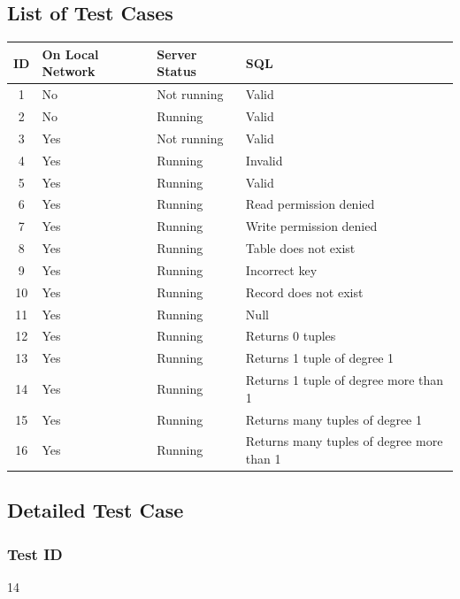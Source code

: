 \documentclass{article}
\begin{document}
\subsection{List of Test Cases}
\begin{center}
  \begin{tabular}{| c | l | l | l |}
    \hline
    ID & On Local Network & Server Status & SQL\\
    \hline
    1 & No & Not running & Valid\\
    2 & No & Running & Valid\\
	3 & Yes & Not running & Valid\\
    4 & Yes & Running & Invalid\\
    5 & Yes & Running & Valid\\
    6 & Yes & Running & Read permission denied\\
    7 & Yes & Running & Write permission denied\\
    8 & Yes & Running & Table does not exist\\
    9 & Yes & Running & Incorrect key\\
    10 & Yes & Running & Record does not exist\\
    11 & Yes & Running & Null\\
    12 & Yes & Running & Returns 0 tuples\\
    13 & Yes & Running & Returns 1 tuple of degree 1\\
    14 & Yes & Running & Returns 1 tuple of degree more than 1\\
    15 & Yes & Running & Returns many tuples of degree 1\\
    16 & Yes & Running & Returns many tuples of degree more than 1\\
    \hline
  \end{tabular}
\end{center}

\subsection{Detailed Test Case}
\subsubsection{Test ID}
14
\end{document}
